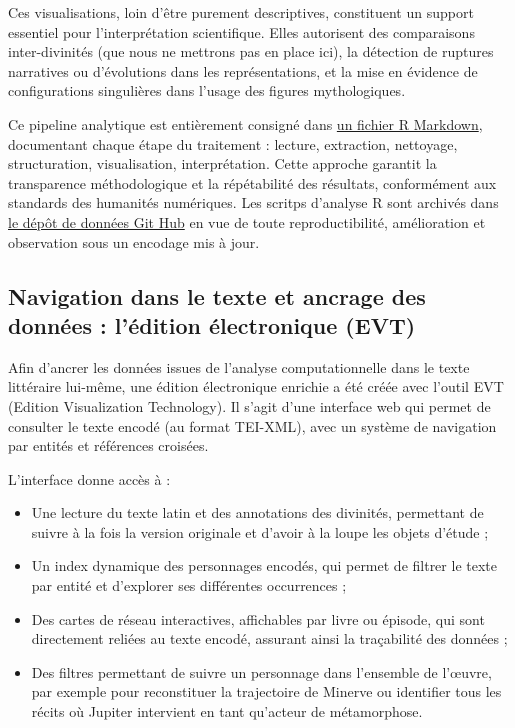 \documentclass[
  letterpaper,
  DIV=11,
  numbers=noendperiod]{scrreprt}
\begin{document}
Ces visualisations, loin d'être purement descriptives, constituent un
support essentiel pour l'interprétation scientifique. Elles autorisent
des comparaisons inter-divinités (que nous ne mettrons pas en place
ici), la détection de ruptures narratives ou d'évolutions dans les
représentations, et la mise en évidence de configurations singulières
dans l'usage des figures mythologiques.

Ce pipeline analytique est entièrement consigné dans \href{…}{un fichier
R Markdown}, documentant chaque étape du traitement : lecture,
extraction, nettoyage, structuration, visualisation, interprétation.
Cette approche garantit la transparence méthodologique et la
répétabilité des résultats, conformément aux standards des humanités
numériques. Les scritps d'analyse R sont archivés dans
\href{https://github.com/pax3l/m2_ovid_deities_analysis_for_quarto}{le
dépôt de données Git Hub} en vue de toute reproductibilité, amélioration
et observation sous un encodage mis à jour.

\subsection{Navigation dans le texte et ancrage des données : l'édition
électronique
(EVT)}\label{navigation-dans-le-texte-et-ancrage-des-donnuxe9es-luxe9dition-uxe9lectronique-evt}

Afin d'ancrer les données issues de l'analyse computationnelle dans le
texte littéraire lui-même, une édition électronique enrichie a été créée
avec l'outil EVT (Edition Visualization Technology). Il s'agit d'une
interface web qui permet de consulter le texte encodé (au format
TEI-XML), avec un système de navigation par entités et références
croisées.

L'interface donne accès à :

\begin{itemize}
\item
  Une lecture du texte latin et des annotations des divinités,
  permettant de suivre à la fois la version originale et d'avoir à la
  loupe les objets d'étude ;
\item
  Un index dynamique des personnages encodés, qui permet de filtrer le
  texte par entité et d'explorer ses différentes occurrences ;
\item
  Des cartes de réseau interactives, affichables par livre ou épisode,
  qui sont directement reliées au texte encodé, assurant ainsi la
  traçabilité des données ;
\item
  Des filtres permettant de suivre un personnage dans l'ensemble de
  l'œuvre, par exemple pour reconstituer la trajectoire de Minerve ou
  identifier tous les récits où Jupiter intervient en tant qu'acteur de
  métamorphose.
\end{itemize}
\end{document}
